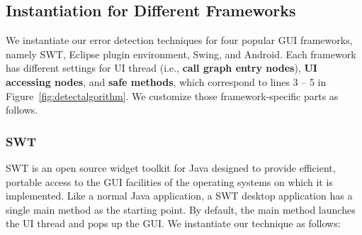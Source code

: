 \subsection{Instantiation for Different Frameworks}
\label{sec:platforms}

We instantiate our error detection techniques for four popular GUI frameworks,
namely SWT, Eclipse plugin environment, Swing, and Android.
Each framework has different settings for UI thread (i.e., \textbf{call graph entry nodes}),
\textbf{UI accessing nodes}, and \textbf{safe methods}, which correspond
to lines 3 -- 5 in Figure~\ref{fig:detectalgorithm}. We customize those
framework-specific parts as follows.





\subsubsection{SWT}

SWT is an open source widget toolkit for Java designed to provide efficient,
portable access to the GUI facilities of the operating systems on which it is implemented.
Like a normal Java application, a SWT desktop application has a single main method
as the starting point. By default, the main method launches
the UI thread and pops up the GUI. We instantiate our technique as follows:


